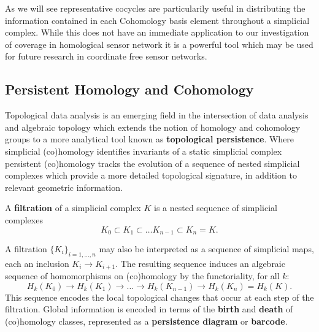 As we will see representative cocycles are particularily useful in distributing the information contained in each Cohomology basis element throughout a simplicial complex.
While this does not have an immediate application to our investigation of coverage in homological sensor network it is a powerful tool which may be used for future research in coordinate free sensor networks.


\subsection{Persistent Homology and Cohomology}

Topological data analysis is an emerging field in the intersection of data analysis and algebraic topology which extends the notion of homology and cohomology groups to a more analytical tool known as \textbf{topological persistence}.
Where simplicial (co)homology identifies invariants of a static simplicial complex persistent (co)homology tracks the evolution of a sequence of nested simplicial complexes which provide a more detailed topological signature, in addition to relevant geometric information.

\begin{definition}
    A \textbf{filtration} of a simplicial complex $K$ is a nested sequence of simplicial complexes \[K_0 \subset K_1\subset\ldots K_{n-1}\subset K_n = K.\]
\end{definition}

A filtration $\{K_i\}_{i=1,\ldots,n}$ may also be interpreted as a sequence of simplicial maps, each an inclusion $K_i\to K_{i+1}$.
The resulting sequence induces an algebraic sequence of homomorphisms on (co)homology by the functoriality, for all $k$:
\[ H_k(K_0)\to H_k(K_1)\to\ldots\to H_k(K_{n-1})\to H_k(K_n) = H_k(K). \]
This sequence encodes the local topological changes that occur at each step of the filtration.
Global information is encoded in terms of the \textbf{birth} and \textbf{death} of (co)homology classes, represented as a \textbf{persistence diagram} or \textbf{barcode}.

